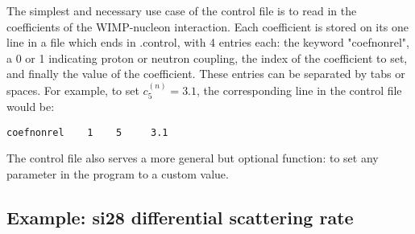 \documentclass[11pt]{amsart}
\begin{document}
The simplest and necessary use case of the control file is to read in the coefficients of the WIMP-nucleon interaction. Each coefficient is stored on its one line in a file which ends in .control, with 4 entries each: the keyword "coefnonrel", a 0 or 1 indicating proton or neutron coupling, the index of the coefficient to set, and finally the value of the coefficient. These entries can be separated by tabs or spaces. For example, to set $c_5^(n)=3.1$, the corresponding line in the control file would be:
\begin{verbatim}
coefnonrel    1    5     3.1
\end{verbatim}

The control file also serves a more general but optional function: to set any parameter in the program to a custom value.


\subsection{Example: si28 differential scattering rate}
\end{document}
